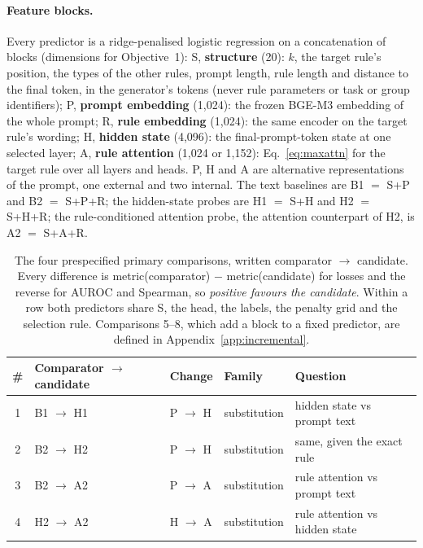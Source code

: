 \documentclass{article}
\newcommand{\blk}[1]{\textsf{#1}}
\newcommand{\cto}{$\rightarrow$}
\begin{document}
\paragraph{Feature blocks.} Every predictor is a ridge-penalised logistic regression on a concatenation of blocks
(dimensions for Objective~1): \blk{S}, \textbf{structure} (20): $k$, the target rule's position, the types of the other
rules, prompt length, rule length and distance to the final token, in the generator's tokens (never rule parameters or
task or group identifiers); \blk{P}, \textbf{prompt embedding} (1,024): the frozen BGE-M3 embedding \citep{chen2024bge}
of the whole prompt; \blk{R}, \textbf{rule embedding} (1,024): the same encoder on the target rule's wording;
\blk{H}, \textbf{hidden state} (4,096): the final-prompt-token state at one selected layer; \blk{A}, \textbf{rule
attention} (1,024 or 1,152): Eq.~\eqref{eq:maxattn} for the target rule over all layers and heads. \blk{P}, \blk{H}
and \blk{A} are alternative representations of the prompt, one external and two internal. The text baselines are
B1 $=$ \blk{S}+\blk{P} and B2 $=$ \blk{S}+\blk{P}+\blk{R}; the hidden-state probes are H1 $=$ \blk{S}+\blk{H} and
H2 $=$ \blk{S}+\blk{H}+\blk{R}; the rule-conditioned attention probe, the attention counterpart of H2, is A2 $=$ \blk{S}+\blk{A}+\blk{R}.

\begin{table}[t]
\centering\small
\caption{The four prespecified primary comparisons, written comparator \cto{} candidate. Every difference is
metric(comparator) $-$ metric(candidate) for losses and the reverse for AUROC and Spearman, so \emph{positive favours
the candidate}. Within a row both predictors share \blk{S}, the head, the labels, the penalty grid and the selection
rule. Comparisons 5--8, which add a block to a fixed predictor, are defined in Appendix~\ref{app:incremental}.}
\label{tab:predictors}
\setlength{\tabcolsep}{4pt}
\begin{tabular}{cllll}
\toprule
\# & Comparator \cto{} candidate & Change & Family & Question \\
\midrule
1 & B1 \cto{} H1 & \blk{P} \cto{} \blk{H} & substitution & hidden state vs prompt text \\
2 & B2 \cto{} H2 & \blk{P} \cto{} \blk{H} & substitution & same, given the exact rule \\
3 & B2 \cto{} A2 & \blk{P} \cto{} \blk{A} & substitution & rule attention vs prompt text \\
4 & H2 \cto{} A2 & \blk{H} \cto{} \blk{A} & substitution & rule attention vs hidden state \\
\bottomrule
\end{tabular}
\end{table}
\end{document}
